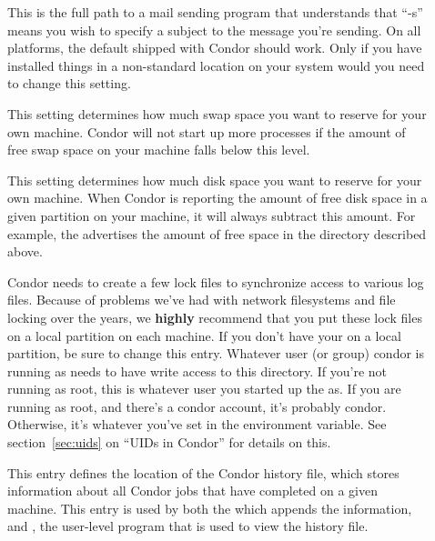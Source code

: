 \begin{description}
\item[] \label{param:Mail} This is the full path to a mail
  sending program that understands that ``-s'' means you wish to
  specify a subject to the message you're sending.  On all platforms,
  the default shipped with Condor should work.  Only if you have
  installed things in a non-standard location on your system would you
  need to change this setting.
  
\item[] \label{param:ReservedSwap} This setting
  determines how much swap space you want to reserve for your own
  machine.  Condor will not start up more  processes if
  the amount of free swap space on your machine falls below this
  level. 

\item[] \label{param:ReservedDisk} This setting
  determines how much disk space you want to reserve for your own
  machine.  When Condor is reporting the amount of free disk space in
  a given partition on your machine, it will always subtract this
  amount.  For example, the  advertises the amount of
  free space in the  directory described above.
  
\item[] \label{param:Lock} Condor needs to create a few
  lock files to synchronize access to various log files.  Because of
  problems we've had with network filesystems and file locking over
  the years, we \textbf{highly} recommend that you put these lock
  files on a local partition on each machine.  If you don't have your
   on a local partition, be sure to change this
  entry.  Whatever user (or group) condor is running as needs to have
  write access to this directory.  If you're not running as root, this
  is whatever user you started up the  as.  If you are
  running as root, and there's a condor account, it's probably condor.
  Otherwise, it's whatever you've set in the 
  environment variable.  See section~\ref{sec:uids} on ``UIDs in
  Condor'' for details on this.

\item[] \label{param:History} This entry defines the
  location of the Condor history file, which stores information about
  all Condor jobs that have completed on a given machine.  This entry
  is used by both the  which appends the information,
  and , the user-level program that is used to view
  the history file.


\end{description}

